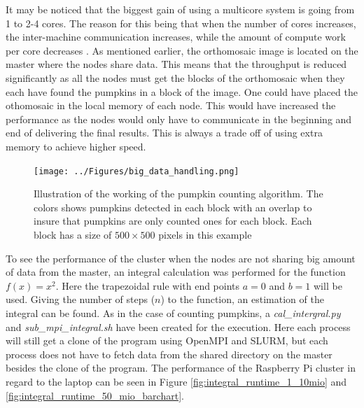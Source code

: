 \documentclass[../Head/Report.tex]{subfiles}
\begin{document}
It may be noticed that the biggest gain of using a multicore system is going from 1 to 2-4 cores. The reason for this being that when the number of cores increases, the inter-machine communication increases, while the amount of compute work per core decreases \cite{multicore_system}. As mentioned earlier, the orthomosaic image is located on the master where the nodes share data. This means that the throughput is reduced significantly as all the nodes must get the blocks of the orthomosaic when they each have found the pumpkins in a block of the image. One could have placed the othomosaic in the local memory of each node. This would have increased the performance as the nodes would only have to communicate in the beginning and end of delivering the final results. This is always a trade off of using extra memory to achieve higher speed.          

\begin{figure}[H]
	\centering
	\captionsetup{justification=centering}
	\texttt{[image: ../Figures/big\_data\_handling.png]}
    \caption{Illustration of the working of the pumpkin counting algorithm. The colors shows pumpkins detected in each block with an overlap to insure that pumpkins are only counted ones for each block. Each block has a size of $500 \times 500$ pixels in this example}
    \label{fig:pumkins_color}
\end{figure}

To see the performance of the cluster when the nodes are not sharing big amount of data from the master, an integral calculation was performed for the function $f(x) = x^2$. Here the trapezoidal rule with end points $a=0$ and $b=1$ will be used. Giving the number of steps ($n$) to the function, an estimation of the integral can be found. As in the case of counting pumpkins, a \textit{cal\_intergral.py} and \textit{sub\_mpi\_integral.sh} have been created for the execution. Here each process will still get a clone of the program using OpenMPI and SLURM, but each process does not have to fetch data from the shared directory on the master besides the clone of the program. The performance of the Raspberry Pi cluster in regard to the laptop can be seen in Figure \ref{fig:integral_runtime_1_10mio} and \ref{fig:integral_runtime_50_mio_barchart}.    
\end{document}
